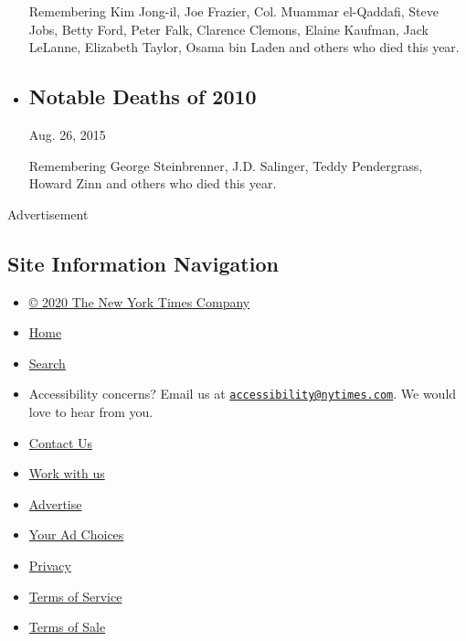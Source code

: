 \begin{itemize}
  Remembering Kim Jong-il, Joe Frazier, Col. Muammar el-Qaddafi, Steve
  Jobs, Betty Ford, Peter Falk, Clarence Clemons, Elaine Kaufman, Jack
  LeLanne, Elizabeth Taylor, Osama bin Laden and others who died this
  year.
\item
  \href{https://www.nytimes.com/interactive/obituaries/20100329_NOTABLEDEATHS.html}{}

  \hypertarget{notable-deaths-of-2010}{%
  \subsection{Notable Deaths of 2010}\label{notable-deaths-of-2010}}

  Aug. 26, 2015

  Remembering George Steinbrenner, J.D. Salinger, Teddy Pendergrass,
  Howard Zinn and others who died this year.
\end{itemize}

Advertisement

\hypertarget{site-information-navigation}{%
\subsection{Site Information
Navigation}\label{site-information-navigation}}

\begin{itemize}
\tightlist
\item
  \href{https://help.nytimes.com/hc/en-us/articles/115014792127-Copyright-notice}{©
  2020 The New York Times Company}
\item
  \href{https://www.nytimes.com}{Home}
\item
  \href{https://www.nytimes.com/search/}{Search}
\item
  Accessibility concerns? Email us at
  \href{mailto:accessibility@nytimes.com}{\nolinkurl{accessibility@nytimes.com}}.
  We would love to hear from you.
\item
  \href{https://help.nytimes.com/hc/en-us/articles/115015385887-Contact-Us}{Contact
  Us}
\item
  \href{https://www.nytco.com/careers/}{Work with us}
\item
  \href{https://nytmediakit.com/}{Advertise}
\item
  \href{https://help.nytimes.com/hc/en-us/articles/115014892108-Privacy-policy\#pp}{Your
  Ad Choices}
\item
  \href{https://help.nytimes.com/hc/en-us/articles/115014892108-Privacy-policy}{Privacy}
\item
  \href{https://help.nytimes.com/hc/en-us/articles/115014893428-Terms-of-service}{Terms
  of Service}
\item
  \href{https://help.nytimes.com/hc/en-us/articles/115014893968-Terms-of-sale}{Terms
  of Sale}
\end{itemize}

